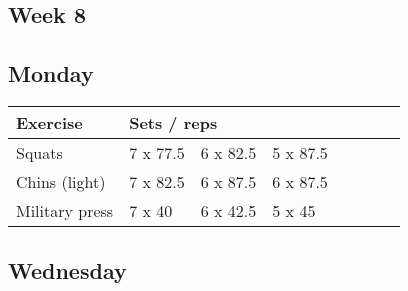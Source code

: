 \documentclass[12pt, a4paper]{article}%
\begin{document}
 \subsection*{\hspace{0.25em} Week 8 }
  \subsection*{\hspace{0.5em} Monday }


  \begin{tabular}{l|lllllll}
  \hspace{0.75em} \textbf{Exercise} & \multicolumn{ 7 }{l}{ \textbf{Sets / reps} } \\ \hline

            \hspace{0.75em} Squats
            & 7 x 77.5
            & 6 x 82.5
            & 5 x 87.5
            & 
            & 
            & 
            & 
            \\


            \hspace{0.75em} Chins (light)
            & 7 x 82.5
            & 6 x 87.5
            & 6 x 87.5
            & 
            & 
            & 
            & 
            \\


            \hspace{0.75em} Military press
            & 7 x 40
            & 6 x 42.5
            & 5 x 45
            & 
            & 
            & 
            & 
            \\


  \end{tabular}

  \subsection*{\hspace{0.5em} Wednesday }
\end{document}
